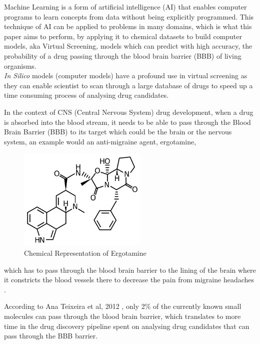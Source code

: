 \documentclass[a4paper,12pt]{report}
\begin{document}
	Machine Learning is a form of artificial intelligence (AI) that enables computer programs to learn concepts from data without being explicitly programmed. This technique of AI can be applied to problems in many domains, which is what this paper aims to perform, by applying it to chemical datasets to build computer models, aka Virtual Screening, models which can predict with high accuracy, the probability of a drug passing through the blood brain barrier (BBB) of living organisms. 
	\\
	
	\textit{In Silico} models (computer models) have a profound use in virtual screening as they can enable scientist to scan through a large database of drugs to speed up a time consuming process of analysing drug candidates. 
	
	In the context of CNS (Central Nervous System) drug development, when a drug is absorbed into the blood stream, it needs to be able to pass through the Blood Brain Barrier (BBB) to its target which could be the brain or the nervous system, an example would an anti-migraine agent, ergotamine, 
		\begin{figure}[H]
			\centering
			\includegraphics[scale=1,width=0.55\textwidth,totalheight=0.3\textheight]{images/Ergotamine-skeletal} 
			\caption{Chemical Representation of Ergotamine}
			\label{fig:ergotamine}
		\end{figure}
	which has to pass through the blood brain barrier to the lining of the brain where it constricts the blood vessels there to decrease the pain from migraine headaches \cite{DrugsCom}. 

	According to Ana Teixeira et al, 2012 \cite{Anaetal2012}, only 2\% of the currently known small molecules can pass through the blood brain barrier, which translates to more time in the drug discovery pipeline spent on analysing drug candidates that can pass through the BBB barrier. \\
\end{document}
